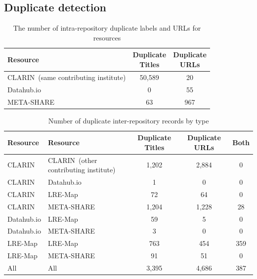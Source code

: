 \documentclass[smallextended]{svjour3}       %
\begin{document}
\subsection{Duplicate detection}

\begin{table}
    \begin{center}
    \begin{tabular}{l|cc}
        Resource   & \thead{Duplicate \\ Titles} & \thead{Duplicate \\ URLs} \\
        \hline                                                            
        CLARIN{\tiny~(same contributing institute)}     & 50,589           & 20          \\   
        Datahub.io & 0                & 55             \\
        META-SHARE & 63               & 967            \\
    \end{tabular}
    \end{center}
    \caption{\label{tab:self-dupes}The number of intra-repository duplicate labels and URLs for
    resources}
\end{table}



\begin{table}
    \begin{center}
        \begin{tabular}{ll|ccc}
        Resource    & Resource    & Duplicate Titles & Duplicate URLs & Both \\
        \hline                                                                  
        CLARIN      & CLARIN{\tiny~(other contributing institute)}      & 1,202            & 2,884          & 0    \\
        CLARIN      & Datahub.io  & 1                & 0              & 0    \\
        CLARIN      & LRE-Map     & 72               & 64             & 0    \\
        CLARIN      & META-SHARE  & 1,204            & 1,228          & 28    \\
        Datahub.io  & LRE-Map     & 59               & 5              & 0    \\
        Datahub.io  & META-SHARE  & 3                & 0              & 0    \\
        LRE-Map     & LRE-Map     & 763              & 454            & 359  \\
        LRE-Map     & META-SHARE  & 91               & 51             & 0    \\
        \hline
        All         & All         & 3,395            & 4,686          & 387  \\
        \end{tabular}
    \end{center}
    \caption{\label{tab:dupes}Number of duplicate inter-repository records by type}
\end{table}
\end{document}
